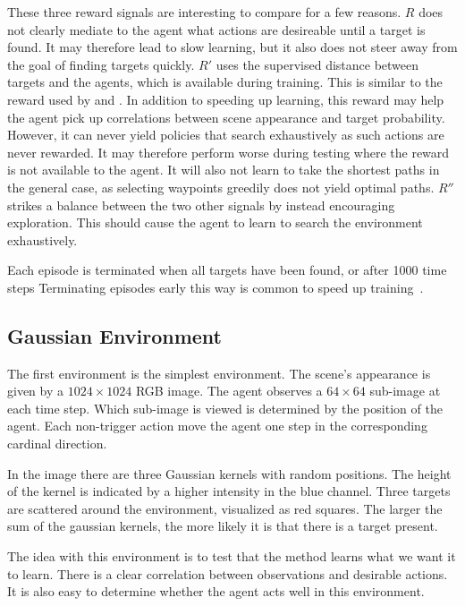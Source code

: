 These three reward signals are interesting to compare for a few reasons.
\(R\) does not clearly mediate to the agent what actions are desireable until a target is found.
It may therefore lead to slow learning, but it also does not steer away from the goal of finding targets quickly.
\(R'\) uses the supervised distance between targets and the agents, which is available during training.
This is similar to the reward used by \cite{caicedo_active_2015} and \cite{ghesu_artificial_2016}.
In addition to speeding up learning, this reward may help the agent pick up correlations between scene appearance and target probability.
However, it can never yield policies that search exhaustively as such actions are never rewarded.
It may therefore perform worse during testing where the reward is not available to the agent.
It will also not learn to take the shortest paths in the general case, as selecting waypoints greedily does not yield optimal paths.
\(R''\) strikes a balance between the two other signals by instead encouraging exploration.
This should cause the agent to learn to search the environment exhaustively.

Each episode is terminated when all targets have been found, or after 1000 time steps
Terminating episodes early this way is common to speed up training~\cite{pardo_timelimits_2022}.

\subsection{Gaussian Environment}

The first environment is the simplest environment. 
The scene's appearance is given by a \(1024 \times 1024\) RGB image.
The agent observes a \(64 \times 64\) sub-image at each time step.
Which sub-image is viewed is determined by the position of the agent.
Each non-trigger action move the agent one step in the corresponding cardinal direction.

In the image there are three Gaussian kernels with random positions.
The height of the kernel is indicated by a higher intensity in the blue channel.
Three targets are scattered around the environment, visualized as red squares.
The larger the sum of the gaussian kernels, the more likely it is that there is a target present.

The idea with this environment is to test that the method learns what we want it to learn.
There is a clear correlation between observations and desirable actions.
It is also easy to determine whether the agent acts well in this environment.

